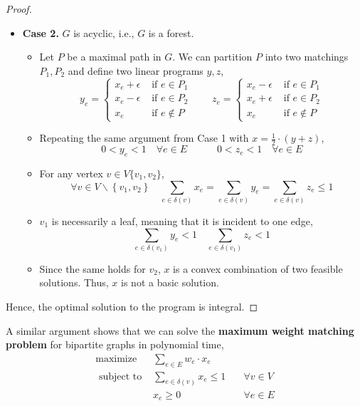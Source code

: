 \begin{proof}
\begin{itemize}
			\item \textbf{Case 2.} $G$ is acyclic, i.e., $G$ is a forest.
			\begin{itemize}
				\item Let $P$ be a maximal path in $G$. We can partition $P$ into two matchings $P_1, P_2$ and define two linear programs $y, z$,
				\[y_{e}=\left\{\begin{array}{ll}x_{e}+\epsilon & \text { if } e \in P_{1} \\ x_{e}-\epsilon & \text { if } e \in P_{2} \\ x_{e} & \text { if } e \notin P\end{array} \quad \quad z_{e}= \begin{cases}x_{e}-\epsilon & \text { if } e \in P_{1} \\ x_{e}+\epsilon & \text { if } e \in P_{2} \\ x_{e} & \text { if } e \notin P\end{cases}\right.\]
				\item Repeating the same argument from Case 1 with $x = \frac{1}{2} \cdot (y + z)$,
				\[0<y_{e}<1 \quad \forall e \in E \quad \quad \quad 0<z_{e}<1 \quad \forall e \in E\]
				\item For any vertex $v \in V \{v_{1}, v_{2}\}$,
				\[\forall v \in V \backslash\left\{v_{1}, v_{2}\right\} \quad \sum_{e \in \delta(v)} x_{e}=\sum_{e \in \delta(v)} y_{e}=\sum_{e \in \delta(v)} z_{e} \leq 1\]
				\item $v_1$ is necessarily a leaf, meaning that it is incident to one edge,
				\[\sum_{e \in \delta\left(v_{1}\right)} y_{e}<1 \quad \sum_{e \in \delta\left(v_{1}\right)} z_{e}<1\]
				\item Since the same holds for $v_2$, $x$ is a convex combination of two feasible solutions. Thus, $x$ is not a basic solution.
			\end{itemize}
		\end{itemize}
		\noindent Hence, the optimal solution to the program is integral.
	\end{proof}

	\begin{cor}
		A similar argument shows that we can solve the \textbf{maximum weight matching problem} for bipartite graphs in polynomial time,
		\[
			\begin{array}{lll}
				\operatorname{maximize} & \sum_{e \in E} w_e \cdot x_{e} & \\
				\text{ subject to } & \sum_{e \in \delta(v)} x_{e} \leq 1 & \quad \forall v \in V \\
				& x_{e} \geq 0 & \quad \forall e \in E
			\end{array}
		\]
	\end{cor}

